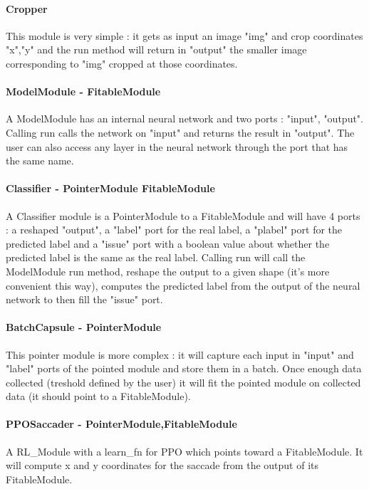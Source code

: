 \documentclass[11pt]{article}
\begin{document}
\paragraph{Cropper}
This module is very simple : it gets as input an image "img" and crop coordinates "x","y" and the run method will return in "output" the smaller image corresponding to "img" cropped at those coordinates.

\paragraph{ModelModule - FitableModule}
A ModelModule has an internal neural network and two ports : "input", "output". Calling run calls the network on "input" and returns the result in "output". The user can also access any layer in the neural network through the port that has the same name.

\paragraph{Classifier - PointerModule FitableModule}
A Classifier module is a PointerModule to a FitableModule and will have 4 ports : a reshaped "output", a "label" port for the real label, a "plabel" port for the predicted label and a "issue" port with a boolean value about whether the predicted label is the same as the real label. Calling run will call the ModelModule run method, reshape the output to a given shape (it's more convenient this way), computes the predicted label from the output of the neural network to then fill the "issue" port.

\paragraph{BatchCapsule - PointerModule}
This pointer module is more complex : it will capture each input in "input" and "label" ports of the pointed module and store them in a batch. Once enough data collected (treshold defined by the user) it will fit the pointed module on collected data (it should point to a FitableModule).

\paragraph{PPOSaccader - PointerModule,FitableModule}
A RL\_Module with a learn\_fn for PPO which points toward a FitableModule. It will compute x and y coordinates for the saccade from the output of its FitableModule.
\end{document}

